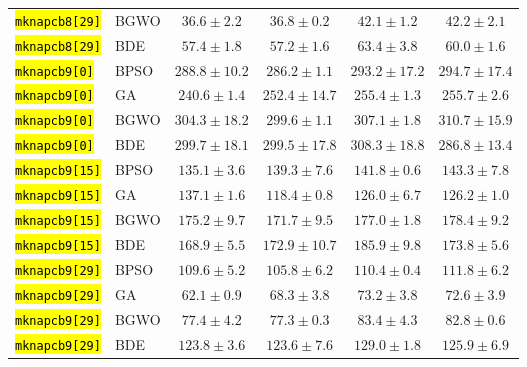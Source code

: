 \documentclass[mathematics,article,accept,moreauthors]{Definitions/mdpi}
\begin{document}
\begin{table}[H]
\begin{tabularx}{\textwidth}{XLCCCC}
    \texttt{\hl{mknapcb8[29]}} & BGWO  &  $\mathbf{36.6 \pm 2.2}$ &           $36.8 \pm 0.2$ &           $42.1 \pm 1.2$ &           $42.2 \pm 2.1$ \\
    \texttt{\hl{mknapcb8[29]}} & BDE   &           $57.4 \pm 1.8$ &  $\mathbf{57.2 \pm 1.6}$ &           $63.4 \pm 3.8$ &           $60.0 \pm 1.6$ \\
    \midrule
    \texttt{\hl{mknapcb9[0]}} & BPSO  &         $288.8 \pm 10.2$ & $\mathbf{286.2 \pm 1.1}$ &         $293.2 \pm 17.2$ &         $294.7 \pm 17.4$ \\
    \texttt{\hl{mknapcb9[0]}} & GA    & $\mathbf{240.6 \pm 1.4}$ &         $252.4 \pm 14.7$ &          $255.4 \pm 1.3$ &          $255.7 \pm 2.6$ \\
    \texttt{\hl{mknapcb9[0]}} & BGWO  &         $304.3 \pm 18.2$ & $\mathbf{299.6 \pm 1.1}$ &          $307.1 \pm 1.8$ &         $310.7 \pm 15.9$ \\
    \texttt{\hl{mknapcb9[0]}} & BDE   &         $299.7 \pm 18.1$ &         $299.5 \pm 17.8$ &         $308.3 \pm 18.8$ & $\mathbf{286.8 \pm 13.4}$ \\
    \midrule
    \texttt{\hl{mknapcb9[15]}} & BPSO  & $\mathbf{135.1 \pm 3.6}$ &          $139.3 \pm 7.6$ &          $141.8 \pm 0.6$ &          $143.3 \pm 7.8$ \\
    \texttt{\hl{mknapcb9[15]}} & GA    &          $137.1 \pm 1.6$ & $\mathbf{118.4 \pm 0.8}$ &          $126.0 \pm 6.7$ &          $126.2 \pm 1.0$ \\
    \texttt{\hl{mknapcb9[15]}} & BGWO  &          $175.2 \pm 9.7$ & $\mathbf{171.7 \pm 9.5}$ &          $177.0 \pm 1.8$ &          $178.4 \pm 9.2$ \\
    \texttt{\hl{mknapcb9[15]}} & BDE   & $\mathbf{168.9 \pm 5.5}$ &         $172.9 \pm 10.7$ &          $185.9 \pm 9.8$ &          $173.8 \pm 5.6$ \\
    \midrule
    \texttt{\hl{mknapcb9[29]}} & BPSO  &          $109.6 \pm 5.2$ & $\mathbf{105.8 \pm 6.2}$ &          $110.4 \pm 0.4$ &          $111.8 \pm 6.2$ \\
    \texttt{\hl{mknapcb9[29]}} & GA    &  $\mathbf{62.1 \pm 0.9}$ &           $68.3 \pm 3.8$ &           $73.2 \pm 3.8$ &           $72.6 \pm 3.9$ \\
    \texttt{\hl{mknapcb9[29]}} & BGWO  &           $77.4 \pm 4.2$ &  $\mathbf{77.3 \pm 0.3}$ &           $83.4 \pm 4.3$ &           $82.8 \pm 0.6$ \\
    \texttt{\hl{mknapcb9[29]}} & BDE   &          $123.8 \pm 3.6$ & $\mathbf{123.6 \pm 7.6}$ &          $129.0 \pm 1.8$ &          $125.9 \pm 6.9$ \\
\bottomrule
\end{tabularx}
\end{table}
\end{document}
